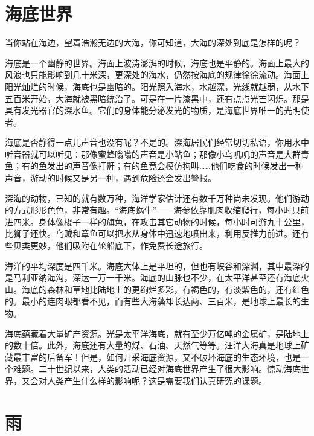 \documentclass[12pt,UTF-8,openany]{ctexbook}
\begin{document}
\chapter{海底世界}

\begin{large}
    
    当你站在海边，望着浩瀚无边的大海，你可知道，大海的深处到底是怎样的呢？
    
    海底是一个幽静的世界。海面上波涛澎湃的时候，海底也是平静的。海面上最大的风浪也只能影响到几十米深，更深处的海水，仍然按海底的规律徐徐流动。海面上阳光灿烂的时候，海底也是幽暗的。阳光照入海水，水越深，光线就越弱，从水下五百米开始，大海就被黑暗统治了。可是在一片漆黑中，还有点点光芒闪烁。那是具有发光器官的深水鱼。它们的身体能分泌发光的物质，是海底世界唯一的光明使者。
    
    海底是否静得一点儿声音也没有呢？不是的。深海居民们经常切切私语，你用水中听音器就可以听见：那像蜜蜂嗡嗡的声音是小鲇鱼；那像小鸟叽叽的声音是大群青鱼；有的鱼发出的声音像打鼾；有的鱼竟会模仿狗叫……他们吃食的时候发出一种声音，游动的时候又是另一种，遇到危险还会发出警报。
    
    深海的动物，已知的就有数万种，海洋学家估计还有数千万种尚未发现。他们游动的方式形形色色，非常有趣。“海底蜗牛”——海参依靠肌肉收缩爬行，每小时只前进四米。身体像梭子一样的旗魚，在攻击其它动物的时候，每小时可游九十公里，比狮子还快。乌贼和章鱼可以把水从身体中迅速地喷出来，利用反推力前进。还有些贝类更妙，他们吸附在轮船底下，作免费长途旅行。
    
    海洋的平均深度是四千米。海底大体上是平坦的，但也有峡谷和深渊，其中最深的是马利亚纳海沟，深达一万一千米。海底的山脉也不少，在太平洋甚至还有海底火山。海底的森林和草地比陆地上的更绚烂多彩，有褐色的，有淡紫色的，还有红色的。最小的连肉眼都看不见，而有些大海藻却长达两、三百米，是地球上最长的生物。
    
    海底蕴藏着大量矿产资源。光是太平洋海底，就有至少万亿吨的金属矿，是陆地上的数十倍。此外，海底还有大量的煤、石油、天然气等等。汪洋大海真是地球上矿藏最丰富的后备军！但是，如何开采海底资源，又不破坏海底的生态环境，也是一个难题。二十世纪以来，人类的活动已经对海底世界产生了很大影响。惊动海底世界，又会对人类产生什么样的影响呢？这是需要我们认真研究的课题。
    
\end{large}



\chapter{雨}
\end{document}
